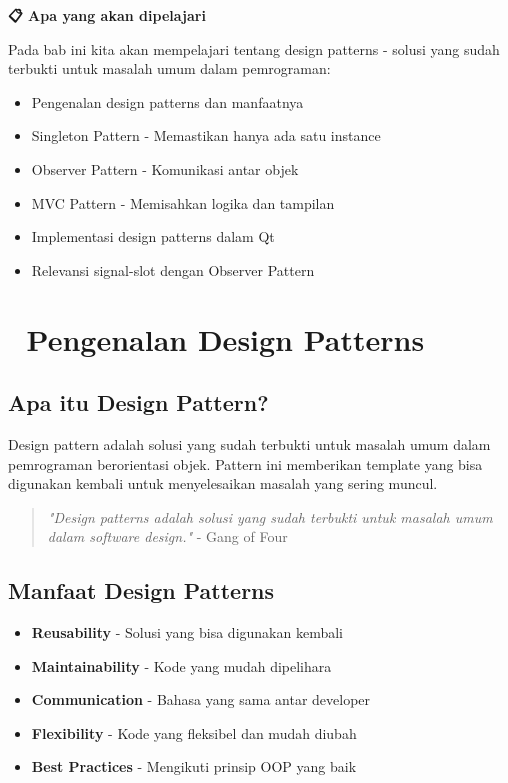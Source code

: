 \textbf{📋 Apa yang akan dipelajari}

Pada bab ini kita akan mempelajari tentang design patterns - solusi yang sudah terbukti untuk masalah umum dalam pemrograman:

\begin{itemize}
\item Pengenalan design patterns dan manfaatnya
\item Singleton Pattern - Memastikan hanya ada satu instance
\item Observer Pattern - Komunikasi antar objek
\item MVC Pattern - Memisahkan logika dan tampilan
\item Implementasi design patterns dalam Qt
\item Relevansi signal-slot dengan Observer Pattern
\end{itemize}

\minitoc

\section{🎨 Pengenalan Design Patterns}

\subsection{Apa itu Design Pattern?}

Design pattern adalah solusi yang sudah terbukti untuk masalah umum dalam pemrograman berorientasi objek. Pattern ini memberikan template yang bisa digunakan kembali untuk menyelesaikan masalah yang sering muncul.

\begin{quote}
\textit{"Design patterns adalah solusi yang sudah terbukti untuk masalah umum dalam software design."} - Gang of Four
\end{quote}

\subsection{Manfaat Design Patterns}

\begin{itemize}
\item \textbf{Reusability} - Solusi yang bisa digunakan kembali
\item \textbf{Maintainability} - Kode yang mudah dipelihara
\item \textbf{Communication} - Bahasa yang sama antar developer
\item \textbf{Flexibility} - Kode yang fleksibel dan mudah diubah
\item \textbf{Best Practices} - Mengikuti prinsip OOP yang baik
\end{itemize}

